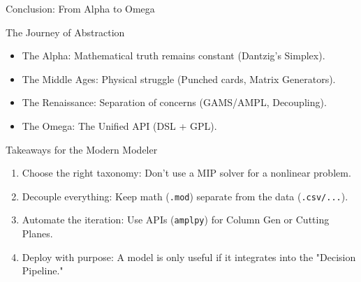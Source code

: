 \documentclass[presentation, aspectratio=169]{beamer}
\begin{document}
\begin{frame}[label={sec:orgc504e94},fragile]{Conclusion: From Alpha to Omega}
 \begin{block}{The Journey of Abstraction}
\begin{itemize}
\item \alert{\alert{The Alpha}}: Mathematical truth remains constant (Dantzig's Simplex).
\item \alert{\alert{The Middle Ages}}: Physical struggle (Punched cards, Matrix Generators).
\item \alert{\alert{The Renaissance}}: Separation of concerns (GAMS/AMPL, Decoupling).
\item \alert{\alert{The Omega}}: The Unified API (DSL + GPL).
\end{itemize}
\end{block}

\begin{block}{Takeaways for the Modern Modeler}
\begin{enumerate}
\item \alert{\alert{Choose the right taxonomy}}: Don't use a MIP solver for a nonlinear problem.
\item \alert{\alert{Decouple everything}}: Keep math (\texttt{.mod}) separate from the data (\texttt{.csv/...}).
\item \alert{\alert{Automate the iteration}}: Use APIs (\texttt{amplpy}) for Column Gen or Cutting Planes.
\item \alert{\alert{Deploy with purpose}}: A model is only useful if it integrates into the "Decision Pipeline."
\end{enumerate}
\end{block}
\end{frame}
\end{document}
